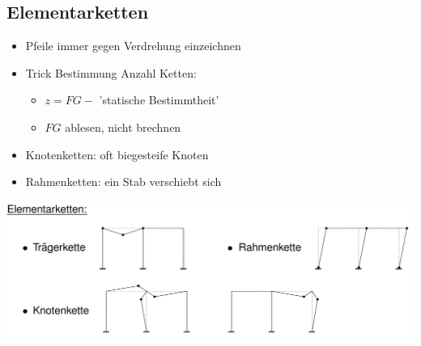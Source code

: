 \documentclass[fleqn,twoside]{article}
\begin{document}
    \subsection{Elementarketten}
        \begin{minipage}{0.5\textwidth}
            \begin{itemize}
                \item Pfeile immer gegen Verdrehung einzeichnen
                \item Trick Bestimmung Anzahl Ketten:
                    \begin{itemize}
                        \item $z=FG -$ 'statische Bestimmtheit'
                        \item $FG$ ablesen, nicht brechnen
                    \end{itemize}
                \item Knotenketten: oft biegesteife Knoten
                \item Rahmenketten: ein Stab verschiebt sich
            \end{itemize}
        \end{minipage}
        \begin{minipage}{0.5\textwidth}
            \includegraphics[scale = 0.2]{Grafiken/Elementarketten.png}
        \end{minipage}

        
\end{document}
